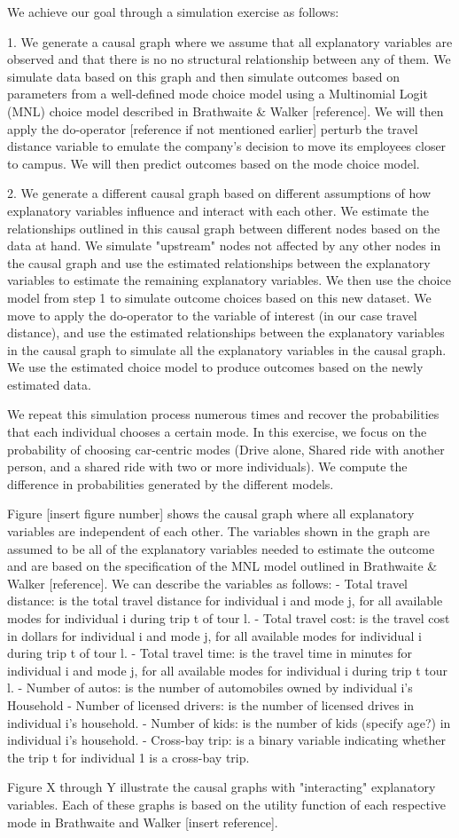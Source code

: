 We achieve our goal through a simulation exercise as follows:

1. We generate a causal graph where we assume that all explanatory variables are observed and that there is no no structural relationship between any of them. 
We simulate data based on this graph and then simulate outcomes based on parameters from a well-defined mode choice model using a Multinomial Logit (MNL) choice model described in Brathwaite & Walker [reference].
We will then apply the do-operator [reference if not mentioned earlier] perturb the travel distance variable to emulate the company's decision to move its employees closer to campus.
We will then predict outcomes based on the mode choice model.

2. We generate a different causal graph based on different assumptions of how explanatory variables influence and interact with each other.
We estimate the relationships outlined in this causal graph between different nodes based on the data at hand.
We simulate "upstream" nodes not affected by any other nodes in the causal graph and use the estimated relationships between the explanatory variables to estimate the remaining explanatory variables.
We then use the choice model from step 1 to simulate outcome choices based on this new dataset.
We move to apply the do-operator to the variable of interest (in our case travel distance), and use the estimated relationships between the explanatory variables in the causal graph to simulate all the explanatory variables in the causal graph.
We use the estimated choice model to produce outcomes based on the newly estimated data. 

We repeat this simulation process numerous times and recover the probabilities that each individual chooses a certain mode. 
In this exercise, we focus on the probability of choosing car-centric modes (Drive alone, Shared ride with another person, and a shared ride with two or more individuals).
We compute the difference in probabilities generated by the different models.

Figure [insert figure number] shows the causal graph where all explanatory variables are independent of each other.
The variables shown in the graph are assumed to be all of the explanatory variables needed to estimate the outcome and are based on the specification of the MNL model outlined in Brathwaite & Walker [reference].
We can describe the variables as follows:
- Total travel distance: is the total travel distance for individual i and mode j, for all available modes for individual i during trip t of tour l.
- Total travel cost: is the travel cost in dollars for individual i and mode j, for all available modes for individual i during trip t of tour l.
- Total travel time: is the travel time in minutes for individual i and mode j, for all available modes for individual i during trip t tour l.
- Number of autos: is the number of automobiles owned by individual i's Household
- Number of licensed drivers: is the number of licensed drives in individual i's household.
- Number of kids: is the number of kids (specify age?) in individual i's household.
- Cross-bay trip: is a binary variable indicating whether the trip t for individual 1 is a cross-bay trip.

Figure X through Y illustrate the causal graphs with "interacting" explanatory variables.
Each of these graphs is based on the utility function of each respective mode in Brathwaite and Walker [insert reference].
\blindtext[2]

\blindtext[2]